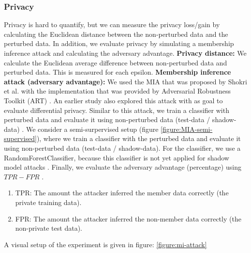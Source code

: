 \subsubsection{Privacy}
Privacy is hard to quantify, but we can measure the privacy loss/gain by calculating the Euclidean distance between the non-perturbed data and the perturbed data.
In addition, we evaluate privacy by simulating a membership inference attack and calculating the adversary advantage. \newline
\textbf{Privacy distance:} We calculate the Euclidean average difference between non-perturbed data and perturbed data.
This is measured for each epsilon. \newline
\textbf{Membership inference attack (adversary advantage):}
%
We used the MIA that was proposed by Shokri et al. with the implementation that was provided by Adversarial Robustness Toolkit (ART) \citep{nicolae_adversarial_2019}.
An earlier study also explored this attack with as goal to evaluate differential privacy.
Similar to this attack, we train a classifier with perturbed data and evaluate it using non-perturbed data (test-data / shadow-data) \citep{zhao_not_2020}.
We consider a semi-surpervised setup (figure \ref{figure:MIA-semi-supervised}), where we train a classifier with the perturbed data and evaluate it using non-perturbed data (test-data / shadow-data).
For the classifier, we use a RandomForestClassifier, because this classifier is not yet applied for shadow model attacks \citep{rigaki_survey_2021}.
Finally, we evaluate the adversary advantage (percentage) using $TPR - FPR$ \citep{yeom_privacy_2018}.
\begin{enumerate}
  \item TPR: The amount the attacker inferred the member data correctly (the private training data).
  \item FPR: The amount the attacker inferred the non-member data correctly (the non-private test data).
\end{enumerate}
A visual setup of the experiment is given in figure: \ref{figure:mi-attack}

